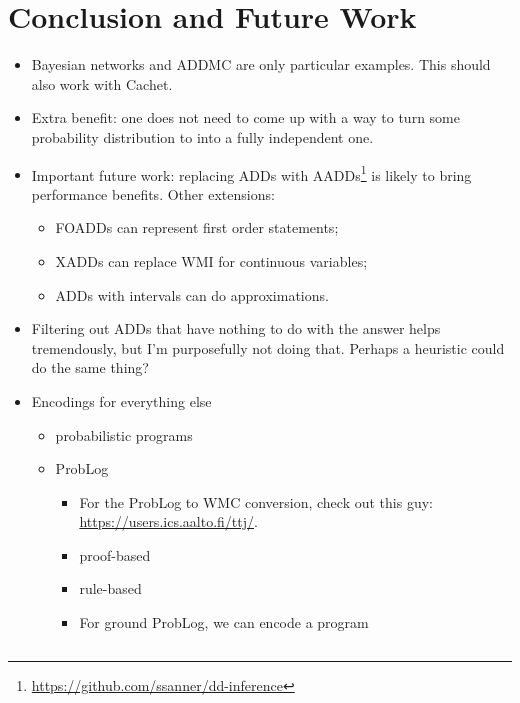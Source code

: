 \documentclass{article}
\theoremstyle{definition}
\theoremstyle{remark}
\begin{document}

\section{Conclusion and Future Work}

\begin{itemize}
\item Bayesian networks and ADDMC are only particular examples. This should also
  work with Cachet.
\item Extra benefit: one does not need to come up with a way to turn some
  probability distribution to into a fully independent one.
\item Important future work: replacing ADDs with
  AADDs\footnote{\url{https://github.com/ssanner/dd-inference}}
  \cite{DBLP:conf/ijcai/SannerM05} is likely to bring performance benefits.
  Other extensions:
  \begin{itemize}
  \item FOADDs can represent first order statements;
  \item XADDs can replace WMI for continuous variables;
  \item ADDs with intervals can do approximations.
  \end{itemize}
\item Filtering out ADDs that have nothing to do with the answer helps
  tremendously, but I'm purposefully not doing that. Perhaps a heuristic could
  do the same thing?
\item Encodings for everything else
  \begin{itemize}
  \item probabilistic programs \cite{DBLP:journals/corr/abs-2005-09089}
  \item ProbLog \cite{DBLP:conf/uai/FierensBTGR11}
    \begin{itemize}
    \item For the ProbLog to WMC conversion, check out this guy:
      \url{https://users.ics.aalto.fi/ttj/}.
    \item proof-based \cite{DBLP:conf/iclp/MantadelisJ10}
    \item rule-based \cite{DBLP:conf/ecai/Janhunen04}
    \item For ground ProbLog, we can encode a program
\begin{verbatim}

\end{verbatim}
\end{itemize}
\end{itemize}
\end{itemize}
\end{document}
